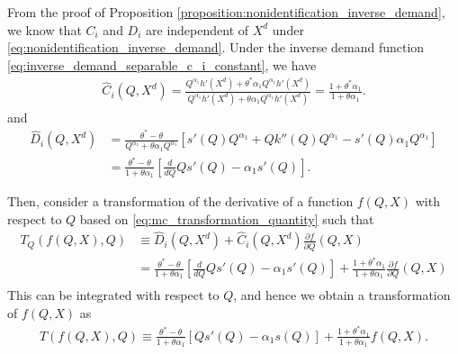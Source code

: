 \documentclass[11pt, a4paper]{article}
\theoremstyle{remark}
\begin{document}
From the proof of Proposition \ref{proposition:nonidentification_inverse_demand}, we know that $C_i$ and $D_i$ are independent of $X^{d}$ under \eqref{eq:nonidentification_inverse_demand}.
Under the inverse demand function \eqref{eq:inverse_demand_separable_c_i_constant}, we have
\begin{align}
    \hat{C}_i(Q, X^{d}) = \frac{Q^{\alpha_1}h'(X^{d}) + \theta^{*}\alpha_1Q^{\alpha_1}h'(X^{d})}{Q^{\alpha_1}h'(X^{d}) + \theta \alpha_1 Q^{\alpha_1}h'(X^{d})} = \frac{1 + \theta^{*}\alpha_1}{1 + \theta\alpha_1}.
\end{align}
and
\begin{align}
    \hat{D}_i(Q, X^{d}) & = \frac{\theta^{*} - \theta}{Q^{\alpha_1} + \theta \alpha_1Q^{\alpha_1}} \left[ s'(Q)Q^{\alpha_1} + Qk''(Q) Q^{\alpha_1} - s'(Q)\alpha_1Q^{\alpha_1} \right]\\
    &= \frac{\theta^{*} - \theta}{1 + \theta\alpha_1} \left[\frac{d}{dQ}Qs'(Q)  -\alpha_1s'(Q) \right].
\end{align}


Then, consider a transformation of the derivative of a function $f(Q, X)$ with respect to $Q$ based on \eqref{eq:mc_transformation_quantity} such that
\begin{align}
    T_Q\left(f(Q,X), Q\right) & \equiv \hat{D}_i(Q, X^{d}) + \hat{C}_i(Q, X^{d}) \frac{\partial f}{\partial Q}(Q, X)\\
    & = \frac{\theta^{*} - \theta}{1 + \theta\alpha_1} \left[\frac{d}{dQ}Qs'(Q)  -\alpha_1s'(Q) \right] + \frac{1 + \theta^{*}\alpha_1}{1 + \theta\alpha_1} \frac{\partial f}{\partial Q}(Q, X)\\
\end{align}
This can be integrated with respect to $Q$, and hence we obtain a transformation of $f(Q, X)$ as
\begin{align}
    T\left(f(Q,X), Q\right) \equiv \frac{\theta^{*} - \theta}{1 + \theta\alpha_1} \left[Qs'(Q) - \alpha_1s(Q) \right] + \frac{1 + \theta^{*}\alpha_1}{1 + \theta\alpha_1} f(Q, X).
\end{align}
\end{document}

